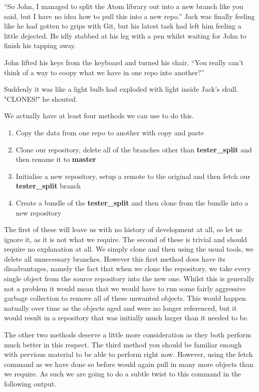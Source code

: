 \begin{trenches}
``So John, I managed to split the Atom library out into a new branch like you said, but I have no idea how to pull this into a new repo.''
Jack was finally feeling like he had gotten to grips with Git, but his latest task had left him feeling a little dejected.
He idly stabbed at his leg with a pen whilst waiting for John to finish his tapping away.

John lifted his keys from the keyboard and turned his chair.
``You really can't think of a way to coopy what we have in one repo into another?''

Suddenly it was like a light bulb had exploded with light inside Jack's skull.  "CLONES!" he shouted.
\end{trenches}

We actually have at least four methods we can use to do this.
\begin{enumerate}
\item Copy the data from one repo to another with copy and paste
\item Clone our repository, delete all of the branches other than \textbf{tester\_split} and then rename it to \textbf{master}
\item Initialise a new repository, setup a remote to the original and then fetch our \textbf{tester\_split} branch
\item Create a bundle of the \textbf{tester\_split} and then clone from the bundle into a new repository
\end{enumerate}

The first of these will leave us with no history of development at all, so let us ignore it, as it is not what we require.
The second of these is trivial and should require no explanation at all.
We simply clone and then using the usual tools, we delete all unnecessary branches.
However this first method does have its disadvantages, namely the fact that when we clone the repository, we take every single object from the source repository into the new one.
Whilst this is generally not a problem it would mean that we would have to run some fairly aggressive garbage collection to remove all of these unwanted objects.
This would happen natually over time as the objects aged and were no longer referenced, but it would result in a repository that was initially much larger than it needed to be.

The other two methods deserve a little more consideration as they both perform much better in this respect.
The third method you should be familiar enough with pervious material to be able to perform right now.
However, using the fetch command as we have done so before would again pull in many more objects than we require.
As such we are going to do a subtle twist to this command in the following output.

